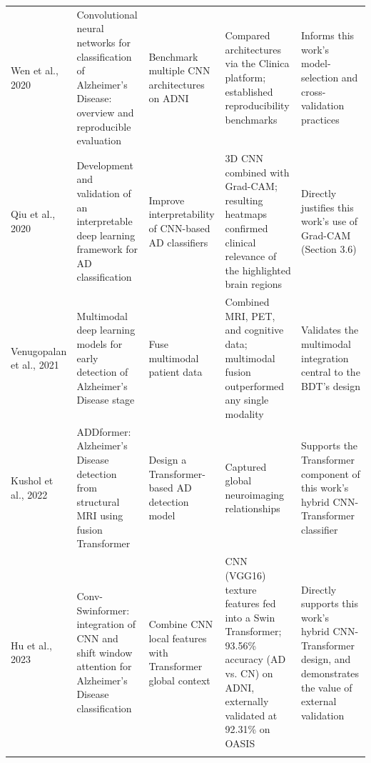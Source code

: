 \documentclass[pdflatex,sn-mathphys-num]{sn-jnl}%
\theoremstyle{thmstyleone}%
\theoremstyle{thmstyletwo}%
\theoremstyle{thmstylethree}%
\begin{document}
\begin{table}
\begin{tabular}{@{}p{0.10\textheight}p{0.17\textheight}p{0.15\textheight}p{0.27\textheight}p{0.18\textheight}@{}}
\addlinespace
Wen et al., 2020 \cite{bib13} & Convolutional neural networks for classification of Alzheimer's Disease: overview and reproducible evaluation & Benchmark multiple CNN architectures on ADNI & Compared architectures via the Clinica platform; established reproducibility benchmarks & Informs this work's model-selection and cross-validation practices \\
\addlinespace
Qiu et al., 2020 \cite{bib17} & Development and validation of an interpretable deep learning framework for AD classification & Improve interpretability of CNN-based AD classifiers & 3D CNN combined with Grad-CAM; resulting heatmaps confirmed clinical relevance of the highlighted brain regions & Directly justifies this work's use of Grad-CAM (Section 3.6) \\
\addlinespace
Venugopalan et al., 2021 \cite{bib16} & Multimodal deep learning models for early detection of Alzheimer's Disease stage & Fuse multimodal patient data & Combined MRI, PET, and cognitive data; multimodal fusion outperformed any single modality & Validates the multimodal integration central to the BDT's design \\
\addlinespace
Kushol et al., 2022 \cite{bib14} & ADDformer: Alzheimer's Disease detection from structural MRI using fusion Transformer & Design a Transformer-based AD detection model & Captured global neuroimaging relationships & Supports the Transformer component of this work's hybrid CNN-Transformer classifier \\
\addlinespace
Hu et al., 2023 \cite{bib15} & Conv-Swinformer: integration of CNN and shift window attention for Alzheimer's Disease classification & Combine CNN local features with Transformer global context & CNN (VGG16) texture features fed into a Swin Transformer; 93.56\% accuracy (AD vs. CN) on ADNI, externally validated at 92.31\% on OASIS & Directly supports this work's hybrid CNN-Transformer design, and demonstrates the value of external validation \\
\addlinespace
\botrule
\end{tabular}
\end{table}
\end{document}
